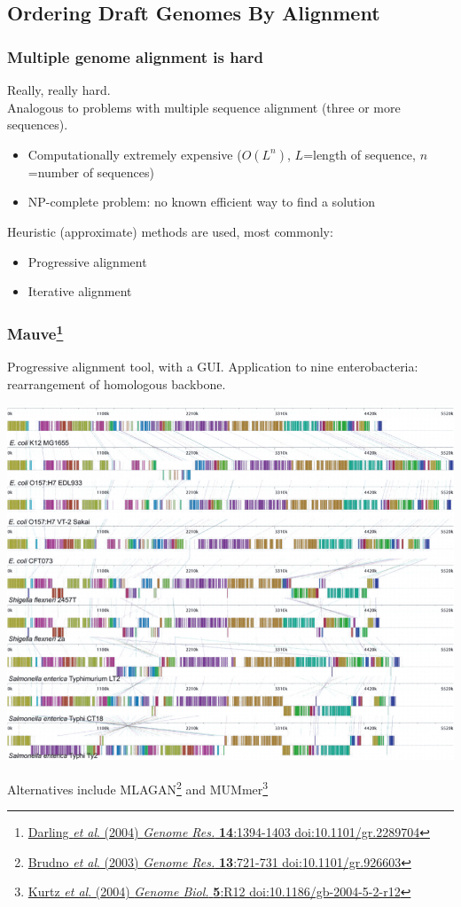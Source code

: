 \subsection{Ordering Draft Genomes By Alignment}

\begin{frame}
  \frametitle{Multiple genome alignment is hard}
  Really, really hard.\\[0.2cm]
  Analogous to problems with multiple sequence alignment (three or more sequences).
  \begin{itemize}
    \item Computationally extremely expensive ($O(L^n)$, $L$=length of sequence, $n$=number of sequences) 
    \item NP-complete problem: no known efficient way to find a solution
  \end{itemize}
  Heuristic (approximate) methods are used, most commonly:
  \begin{itemize}
    \item Progressive alignment
    \item Iterative alignment
  \end{itemize}
\end{frame}

\begin{frame}
  \frametitle{Mauve\footnote{\tiny{\href{http://dx.doi.org/10.1101/gr.2289704}{Darling \textit{et al}. (2004) \textit{Genome Res.} \textbf{14}:1394-1403 doi:10.1101/gr.2289704}}}}
  Progressive alignment tool, with a GUI. Application to nine enterobacteria: rearrangement of homologous backbone.
  \begin{center}
    \includegraphics[height=0.46\textheight]{images/mauve_entero}
  \end{center}        
  Alternatives include MLAGAN\footnote{\tiny{\href{http://dx.doi.org/10.1101/gr.926603}{Brudno \textit{et al}. (2003) \textit{Genome Res.} \textbf{13}:721-731 doi:10.1101/gr.926603}}} and MUMmer\footnote{\tiny{\href{http://dx.doi.org/10.1186/gb-2004-5-2-r12}{Kurtz \textit{et al}. (2004) \textit{Genome Biol.} \textbf{5}:R12 doi:10.1186/gb-2004-5-2-r12}}}
\end{frame}

